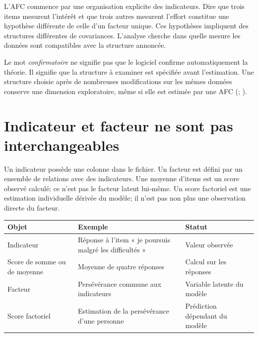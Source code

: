 \documentclass[
  french,
  11pt,
  a4paper,
  DIV=11,
  numbers=noendperiod]{scrreprt}
\newcounter{none} %
\begin{document}
L'AFC commence par une organisation explicite des indicateurs. Dire que
trois items mesurent l'intérêt et que trois autres mesurent l'effort
constitue une hypothèse différente de celle d'un facteur unique. Ces
hypothèses impliquent des structures différentes de covariances.
L'analyse cherche dans quelle mesure les données sont compatibles avec
la structure annoncée.

Le mot \emph{confirmatoire} ne signifie pas que le logiciel confirme
automatiquement la théorie. Il signifie que la structure à examiner est
spécifiée avant l'estimation. Une structure choisie après de nombreuses
modifications sur les mêmes données conserve une dimension exploratoire,
même si elle est estimée par une AFC (; ).

\section{Indicateur et facteur ne sont pas
interchangeables}\label{indicateur-et-facteur-ne-sont-pas-interchangeables}

Un indicateur possède une colonne dans le fichier. Un facteur est défini
par un ensemble de relations avec des indicateurs. Une moyenne d'items
est un score observé calculé; ce n'est pas le facteur latent lui-même.
Un score factoriel est une estimation individuelle dérivée du modèle; il
n'est pas non plus une observation directe du facteur.


{\def\LTcaptype{none} %
\begin{longtable}[]{@{}
  >{\raggedright\arraybackslash}p{}
  >{\raggedright\arraybackslash}p{}
  >{\raggedright\arraybackslash}p{}@{}}
\toprule\noalign{}
\begin{minipage}[b]{\linewidth}\raggedright
Objet
\end{minipage} & \begin{minipage}[b]{\linewidth}\raggedright
Exemple
\end{minipage} & \begin{minipage}[b]{\linewidth}\raggedright
Statut
\end{minipage} \\
\midrule\noalign{}
\endhead
\bottomrule\noalign{}
\endlastfoot
Indicateur & Réponse à l'item « je poursuis malgré les difficultés » &
Valeur observée \\
Score de somme ou de moyenne & Moyenne de quatre réponses & Calcul sur
les réponses \\
Facteur & Persévérance commune aux indicateurs & Variable latente du
modèle \\
Score factoriel & Estimation de la persévérance d'une personne &
Prédiction dépendant du modèle \\
\end{longtable}
}
\end{document}
